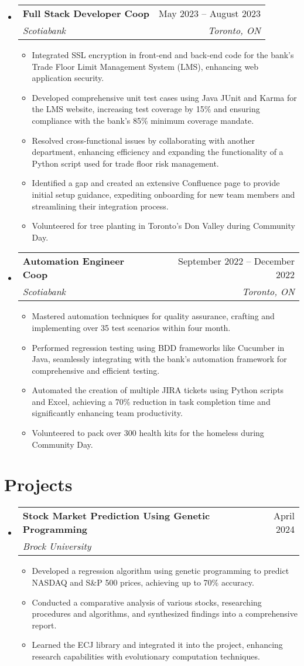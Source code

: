 \documentclass[letterpaper,11pt]{article}
\makeatletter
\newcommand{\resumeItem}[1]{
  \item\small{
    {#1 \vspace{-2pt}}
  }
}
\newcommand{\resumeSubheading}[4]{
  \vspace{-2pt}\item
    \begin{tabular*}{0.97\textwidth}[t]{l@{\extracolsep{\fill}}r}
      \textbf{#1} & #2 \\
      \textit{\small#3} & \textit{\small #4} \\
    \end{tabular*}\vspace{-7pt}
}
\newcommand{\resumeSubHeadingListStart}{\begin{itemize}[leftmargin=0.15in, label={}]}
\newcommand{\resumeSubHeadingListEnd}{\end{itemize}}
\newcommand{\resumeItemListStart}{\begin{itemize}}
\newcommand{\resumeItemListEnd}{\end{itemize}\vspace{-5pt}}
\makeatother
\begin{document}
\begin{center}
\newpage
  \resumeSubHeadingListStart
    \resumeSubheading
    {Full Stack Developer Coop}{May 2023 -- August 2023}
    {Scotiabank}{Toronto, ON}
      \resumeItemListStart
        \resumeItem{Integrated SSL encryption in front-end and back-end code for the bank's Trade Floor Limit Management System (LMS), enhancing web application security.}
        \resumeItem{Developed comprehensive unit test cases using Java JUnit and Karma for the LMS website, increasing test coverage by 15\% and ensuring compliance with the bank’s 85\% minimum coverage mandate.}
      \resumeItem{Resolved cross-functional issues by collaborating with another department, enhancing efficiency and expanding the functionality of a Python script used for trade floor risk management.}
      \resumeItem{Identified a gap and created an extensive Confluence page to provide initial setup guidance, expediting onboarding for new team members and streamlining their integration process.}
      \resumeItem{Volunteered for tree planting in Toronto’s Don Valley during Community Day.}
    \resumeItemListEnd
\resumeSubHeadingListEnd

\resumeSubHeadingListStart
  \resumeSubheading
    {Automation Engineer Coop}{September 2022 -- December 2022}
    {Scotiabank}{Toronto, ON}
    \resumeItemListStart
      \resumeItem{Mastered automation techniques for quality assurance, crafting and implementing over 35 test scenarios within four month.}
      \resumeItem{Performed regression testing using BDD frameworks like Cucumber in Java, seamlessly integrating with the bank’s automation framework for comprehensive and efficient testing.}
      \resumeItem{Automated the creation of multiple JIRA tickets using Python scripts and Excel, achieving a 70\% reduction in task completion time and significantly enhancing team productivity.}
      \resumeItem{Volunteered to pack over 300 health kits for the homeless during Community Day.}
    \resumeItemListEnd
\resumeSubHeadingListEnd

\section{Projects}

\resumeSubHeadingListStart
  \resumeSubheading
    {Stock Market Prediction Using Genetic Programming}{April 2024}
    {Brock University}{}
    \resumeItemListStart
      \resumeItem{Developed a regression algorithm using genetic programming to predict NASDAQ and S\&P 500 prices, achieving up to 70\% accuracy.}
      \resumeItem{Conducted a comparative analysis of various stocks, researching procedures and algorithms, and synthesized findings into a comprehensive report.}
      \resumeItem{Learned the ECJ library and integrated it into the project, enhancing research capabilities with evolutionary computation techniques.}
    \resumeItemListEnd
\resumeSubHeadingListEnd


\end{center}
\end{document}
